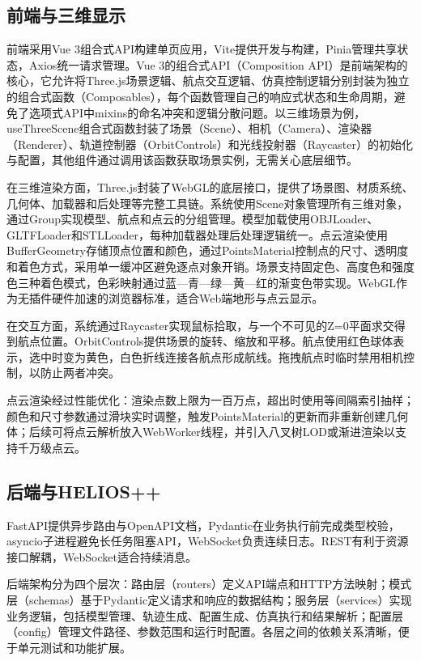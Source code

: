\documentclass[a4paper,fleqn]{cas-sc}
\begin{document}
\subsection{前端与三维显示}

前端采用Vue 3组合式API构建单页应用，Vite提供开发与构建\citep{vite}，Pinia管理共享状态\citep{pinia}，Axios统一请求管理。Vue 3的组合式API（Composition API）是前端架构的核心，它允许将Three.js场景逻辑、航点交互逻辑、仿真控制逻辑分别封装为独立的组合式函数（Composables），每个函数管理自己的响应式状态和生命周期，避免了选项式API中mixins的命名冲突和逻辑分散问题。以三维场景为例，useThreeScene组合式函数封装了场景（Scene）、相机（Camera）、渲染器（Renderer）、轨道控制器（OrbitControls）和光线投射器（Raycaster）的初始化与配置，其他组件通过调用该函数获取场景实例，无需关心底层细节。

在三维渲染方面，Three.js封装了WebGL的底层接口，提供了场景图、材质系统、几何体、加载器和后处理等完整工具链\citep{threejs}。系统使用Scene对象管理所有三维对象，通过Group实现模型、航点和点云的分组管理。模型加载使用OBJLoader、GLTFLoader和STLLoader，每种加载器处理后处理逻辑统一。点云渲染使用BufferGeometry存储顶点位置和颜色，通过PointsMaterial控制点的尺寸、透明度和着色方式，采用单一缓冲区避免逐点对象开销。场景支持固定色、高度色和强度色三种着色模式，色彩映射通过蓝—青—绿—黄—红的渐变色带实现。WebGL作为无插件硬件加速的浏览器标准，适合Web端地形与点云显示\citep{webgl,pointCloudTerrain,pointCloudWeb}。

在交互方面，系统通过Raycaster实现鼠标拾取，与一个不可见的Z=0平面求交得到航点位置。OrbitControls提供场景的旋转、缩放和平移。航点使用红色球体表示，选中时变为黄色，白色折线连接各航点形成航线。拖拽航点时临时禁用相机控制，以防止两者冲突。

点云渲染经过性能优化：渲染点数上限为一百万点，超出时使用等间隔索引抽样；颜色和尺寸参数通过滑块实时调整，触发PointsMaterial的更新而非重新创建几何体；后续可将点云解析放入WebWorker线程，并引入八叉树LOD或渐进渲染以支持千万级点云\citep{pointCloudRendering}。

\subsection{后端与HELIOS++}

FastAPI提供异步路由与OpenAPI文档\citep{fastapi}，Pydantic在业务执行前完成类型校验\citep{pydantic}，asyncio子进程避免长任务阻塞API，WebSocket负责连续日志\citep{WebSocket}。REST有利于资源接口解耦\citep{fielding2000rest}，WebSocket适合持续消息。

后端架构分为四个层次：路由层（routers）定义API端点和HTTP方法映射；模式层（schemas）基于Pydantic定义请求和响应的数据结构；服务层（services）实现业务逻辑，包括模型管理、轨迹生成、配置生成、仿真执行和结果解析；配置层（config）管理文件路径、参数范围和运行时配置。各层之间的依赖关系清晰，便于单元测试和功能扩展。
\end{document}
